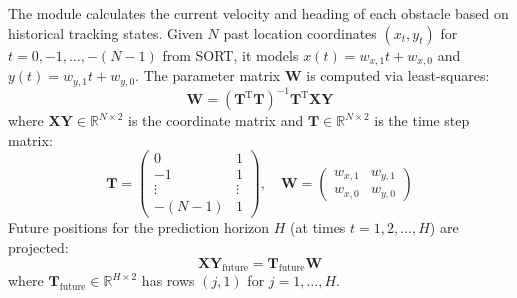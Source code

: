 \documentclass[11pt,a4paper]{report}
\begin{document}
The module calculates the current velocity and heading of each obstacle based on historical tracking states. Given $N$ past location coordinates $(x_t, y_t)$ for $t = 0, -1, \dots, -(N-1)$ from SORT, it models $x(t) = w_{x,1} t + w_{x,0}$ and $y(t) = w_{y,1} t + w_{y,0}$. The parameter matrix $\mathbf{W}$ is computed via least-squares:
\begin{equation}
    \mathbf{W} = (\mathbf{T}^{\text{T}} \mathbf{T})^{-1} \mathbf{T}^{\text{T}} \mathbf{XY}
\end{equation}
where $\mathbf{XY} \in \mathbb{R}^{N \times 2}$ is the coordinate matrix and $\mathbf{T} \in \mathbb{R}^{N \times 2}$ is the time step matrix:
\begin{equation}
    \mathbf{T} = \begin{pmatrix} 0 & 1 \\ -1 & 1 \\ \vdots & \vdots \\ -(N-1) & 1 \end{pmatrix}, \quad \mathbf{W} = \begin{pmatrix} w_{x,1} & w_{y,1} \\ w_{x,0} & w_{y,0} \end{pmatrix}
\end{equation}
Future positions for the prediction horizon $H$ (at times $t = 1, 2, \dots, H$) are projected:
\begin{equation}
    \mathbf{XY}_{\text{future}} = \mathbf{T}_{\text{future}} \mathbf{W}
\end{equation}
where $\mathbf{T}_{\text{future}} \in \mathbb{R}^{H \times 2}$ has rows $(j, 1)$ for $j = 1, \dots, H$.
\end{document}
